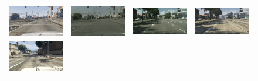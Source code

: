 \begin{figure}[h]
{\begin{tabular}{cc cc}
   \\
    \includegraphics[width=\myw, height=\myh]{figs/gta-cityscapes/gta-01946-fs8.png} &
    \includegraphics[width=\myw, height=\myh]{figs/gta-cityscapes/fake-cityscapes-01946-fs8.png} &
    \includegraphics[width=\myw, height=\myh]{figs/gta-cityscapes/cityscapes-01946-fs8.png} &
    \includegraphics[width=\myw, height=\myh]{figs/gta-cityscapes/fake-gta-01946-fs8.png}
   \\
    \includegraphics[width=\myw, height=\myh]{figs/gta-cityscapes/gta-02212-fs8.png} &

\end{tabular}}
\end{figure}
